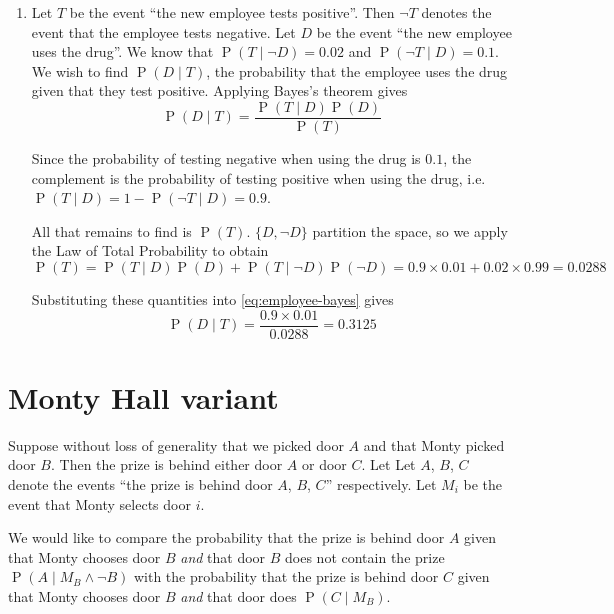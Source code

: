 \documentclass[letterpaper,11pt]{article}
\DeclareMathOperator{\Prob}{P}
\renewcommand{\P}[1]{\Prob{\parens{#1}}}
\newcommand{\parens}[1]{\left(#1\right)}
\newcommand{\given}{\;\vert\;}
\newcommand{\question}{\section}
\begin{document}
\begin{enumerate}
    \item
        Let $T$ be the event ``the new employee tests positive''. Then $\neg T$
        denotes the event that the employee tests negative.
        Let $D$ be the event ``the new employee uses the drug''.
        We know that $\P{T \given \neg D} = 0.02$
        and $\P{\neg T \given D} = 0.1$.
        We wish to find $\P{D \given T}$, the probability that the employee
        uses the drug given that they test positive.
        Applying Bayes's theorem gives
        \begin{equation*}
            \label{eq:employee-bayes}
            \P{D \given T} = \frac{
                \P{T \given D} \P{D}
            }{
                \P{T}
            }
        \end{equation*}

        Since the probability of testing negative when using the drug is $0.1$,
        the complement is the probability of testing positive when using the
        drug, i.e. $\P{T \given D} = 1 - \P{\neg T \given D} = 0.9$.

        All that remains to find is $\P{T}$. $\{D, \neg D\}$ partition the
        space, so we apply the Law of Total Probability to obtain
        \begin{equation*}
            \P{T} = \P{T \given D} \P{D} + \P{T \given \neg D} \P{\neg D}
            = 0.9 \times 0.01 + 0.02 \times 0.99
            = 0.0288
        \end{equation*}

        Substituting these quantities into \eqref{eq:employee-bayes} gives
        \begin{equation*}
            \P{D \given T} = \frac{
                0.9 \times 0.01
            }{
                0.0288
            }
            = 0.3125
        \end{equation*}
\end{enumerate}

\question{Monty Hall variant}

Suppose without loss of generality that we picked door $A$ and that Monty
picked door $B$. Then the prize is behind either door $A$ or door $C$. Let
Let $A$, $B$, $C$ denote the events ``the prize is behind door $A$, $B$, $C$''
respectively. Let $M_i$ be the event that Monty selects door $i$.

We would like to compare the probability that the prize is behind door $A$
given that Monty chooses door $B$ \emph{and} that door $B$ does not contain the
prize $\P{A \given M_B \land \neg B}$
with the probability that the prize is behind door $C$ given that Monty chooses
door $B$ \emph{and} that door does  $\P{C \given M_B}$.
\end{document}
